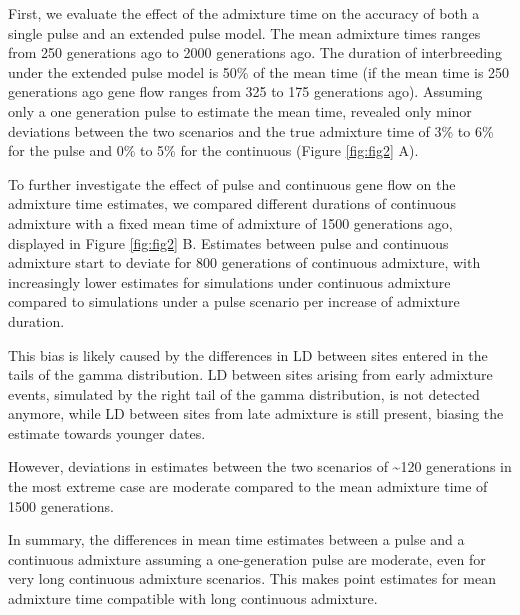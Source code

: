 \documentclass[]{article}
\begin{document}
First, we evaluate the effect of the admixture time on the accuracy of both a single pulse and an extended pulse model. The mean admixture times ranges
from 250 generations ago to 2000 generations ago.  The duration
of interbreeding under the extended pulse model is 50\% of the mean time (if the
mean time is 250 generations ago gene flow ranges from 325 to 175
generations ago). Assuming only a one generation pulse to estimate the
mean time, revealed only minor deviations between the two scenarios and
the true admixture time of 3\% to 6\% for the pulse and 0\% to 5\% for
the continuous (Figure \ref{fig:fig2} A).



To
further investigate the effect of pulse and continuous gene flow on the
admixture time estimates, we compared different durations of continuous
admixture with a fixed mean time of admixture of 1500
generations ago, displayed in Figure \ref{fig:fig2} B. Estimates between
pulse and continuous admixture start to deviate for 800 generations of
continuous admixture, with increasingly lower estimates for simulations
under continuous admixture compared to simulations under a pulse scenario per increase of admixture duration.

This bias is likely caused
by the differences in LD between sites entered in the tails of the gamma
distribution. LD between sites arising from early admixture events,
simulated by the right tail of the gamma distribution, is not detected
anymore, while LD between sites from late admixture is still present,
biasing the estimate towards younger dates. 

However, deviations in
estimates between the two scenarios of \textasciitilde{}120 generations
in the most extreme case are moderate compared to the mean admixture
time of 1500 generations.

In summary, the differences in mean time estimates between a pulse and a continuous admixture assuming a one-generation pulse are moderate, even for very long continuous admixture scenarios. This makes point estimates for mean admixture time compatible with long continuous admixture.
\end{document}
